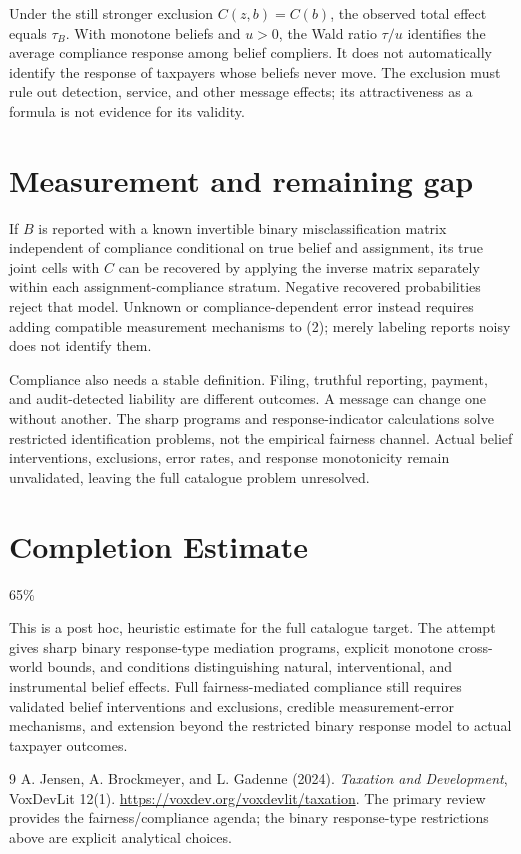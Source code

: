 \documentclass[11pt,a4paper]{article}
\begin{document}
Under the still stronger exclusion $C(z,b)=C(b)$, the observed total effect equals $\tau_B$. With monotone beliefs and $u>0$, the Wald ratio $\tau/u$ identifies the average compliance response among belief compliers. It does not automatically identify the response of taxpayers whose beliefs never move. The exclusion must rule out detection, service, and other message effects; its attractiveness as a formula is not evidence for its validity.
\section{Measurement and remaining gap}
If $B$ is reported with a known invertible binary misclassification matrix independent of compliance conditional on true belief and assignment, its true joint cells with $C$ can be recovered by applying the inverse matrix separately within each assignment-compliance stratum. Negative recovered probabilities reject that model. Unknown or compliance-dependent error instead requires adding compatible measurement mechanisms to (2); merely labeling reports noisy does not identify them.

Compliance also needs a stable definition. Filing, truthful reporting, payment, and audit-detected liability are different outcomes. A message can change one without another. The sharp programs and response-indicator calculations solve restricted identification problems, not the empirical fairness channel. Actual belief interventions, exclusions, error rates, and response monotonicity remain unvalidated, leaving the full catalogue problem unresolved.

\section{Completion Estimate}
65\%

This is a post hoc, heuristic estimate for the full catalogue target.
The attempt gives sharp binary response-type mediation programs, explicit monotone cross-world bounds, and conditions distinguishing natural, interventional, and instrumental belief effects. Full fairness-mediated compliance still requires validated belief interventions and exclusions, credible measurement-error mechanisms, and extension beyond the restricted binary response model to actual taxpayer outcomes.

\begin{thebibliography}{9}
 A. Jensen, A. Brockmeyer, and L. Gadenne (2024).
\emph{Taxation and Development}, VoxDevLit 12(1).
\url{https://voxdev.org/voxdevlit/taxation}.
The primary review provides the fairness/compliance agenda; the binary response-type restrictions above are explicit analytical choices.
\end{thebibliography}
\end{document}
